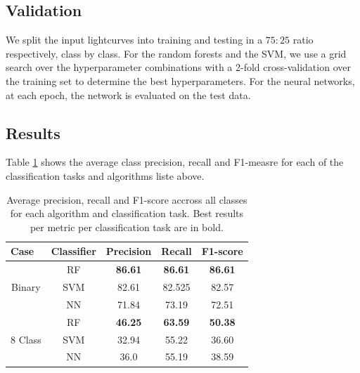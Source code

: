 \documentclass[twocolumn]{aastex62}
\begin{document}
\subsection{Validation} \label{subsection_importances}

We split the input lightcurves into training and testing in a $75:25$
ratio respectively, class by class. 
For the random forests and the SVM, we use a grid search over the
hyperparameter combinations with a 2-fold cross-validation over the
training set to determine the best hyperparameters.  
For the neural networks, at each epoch, the network is evaluated on
the test data.  


\subsection{Results}

Table \ref{table:all-avg-results} shows the average class precision,
recall and F1-measre for each of the classification tasks and
algorithms liste above.  


\begin{table}
\centering
\begin{tabular}{ccccc}
\hline
\multicolumn{1}{l}{\textbf{Case}} & \textbf{Classifier} & \textbf{Precision} & \textbf{Recall} & \textbf{F1-score} \\ \hline \hline
\multirow{3}{*}{Binary}                 & RF                  & \textbf{86.61}    & \textbf{86.61} & \textbf{86.61}   \\
                                        & SVM                 & 82.61             & 82.525          & 82.57             \\
                                        & NN                  & 71.84              & 73.19           & 72.51             \\ \hline
\multirow{3}{*}{8 Class}                & RF                  & \textbf{46.25}     & \textbf{63.59}  & \textbf{50.38}             \\
                                        & SVM                 & 32.94              & 55.22           & 36.60             \\
                                        & NN                  & 36.0     & 55.19           & 38.59   \\ \hline
\end{tabular}%
\caption{Average precision, recall and F1-score accross all classes
  for each algorithm and classification task. Best results per metric
  per classification task are in bold.} 
\label{table:all-avg-results}
\end{table}
\end{document}
